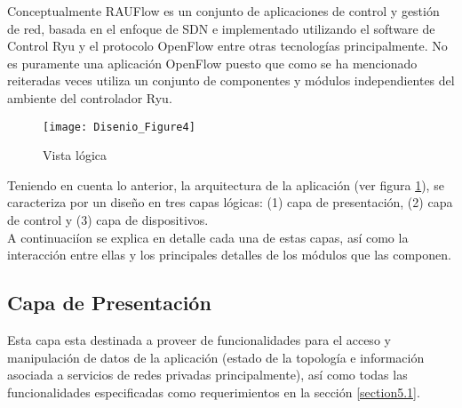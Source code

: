 Conceptualmente RAUFlow es un conjunto de aplicaciones de control y gestión de red, basada en el enfoque de SDN e implementado utilizando el software de Control Ryu y el protocolo OpenFlow entre otras tecnologías principalmente. No es puramente una aplicaci\'on OpenFlow puesto que como se ha mencionado reiteradas veces utiliza un conjunto de componentes y m\'odulos independientes del ambiente del controlador Ryu.




\begin{figure}[h] 
\centering    
\texttt{[image: Disenio\_Figure4]}
\caption[Vista l\'ogica]{Vista l\'ogica}
\label{fig:VistaComponentes2}
\end{figure}

Teniendo en cuenta lo anterior, la arquitectura de la aplicaci\'on (ver figura \ref{fig:VistaComponentes2}), se caracteriza por un diseño en tres capas l\'ogicas: (1) capa de presentaci\'on, (2) capa de control y (3) capa de dispositivos.\\

A continuaci\'ion se explica en detalle cada una de estas capas, as\'i como la interacci\'on entre ellas y los principales detalles de los m\'odulos que las componen.

\subsection{Capa de Presentación}
Esta capa esta destinada a proveer de funcionalidades para el acceso y manipulaci\'on de datos de la aplicaci\'on (estado de la topolog\'ia e informaci\'on asociada a servicios de redes privadas principalmente), as\'i como todas las funcionalidades especificadas como requerimientos en la secci\'on 
\ref{section5.1}.\\ 


